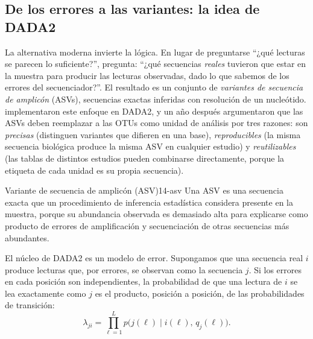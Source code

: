 \subsection{De los errores a las variantes: la idea de DADA2}

La alternativa moderna invierte la lógica. En lugar de preguntarse ``¿qué lecturas se parecen lo suficiente?'', pregunta: ``¿qué secuencias \emph{reales} tuvieron que estar en la muestra para producir las lecturas observadas, dado lo que sabemos de los errores del secuenciador?''. El resultado es un conjunto de \emph{variantes de secuencia de amplicón} (ASVs), secuencias exactas inferidas con resolución de un nucleótido. \textcite{c14-callahan2016} implementaron este enfoque en DADA2, y un año después \textcite{c14-callahan2017} argumentaron que las ASVs deben reemplazar a las OTUs como unidad de análisis por tres razones: son \emph{precisas} (distinguen variantes que difieren en una base), \emph{reproducibles} (la misma secuencia biológica produce la misma ASV en cualquier estudio) y \emph{reutilizables} (las tablas de distintos estudios pueden combinarse directamente, porque la etiqueta de cada unidad es su propia secuencia).

\begin{definicion}{Variante de secuencia de amplicón (ASV)}{14-asv}
Una ASV es una secuencia exacta que un procedimiento de inferencia estadística considera presente en la muestra, porque su abundancia observada es demasiado alta para explicarse como producto de errores de amplificación y secuenciación de otras secuencias más abundantes.
\end{definicion}

El núcleo de DADA2 es un modelo de error. Supongamos que una secuencia real $i$ produce lecturas que, por errores, se observan como la secuencia $j$. Si los errores en cada posición son independientes, la probabilidad de que una lectura de $i$ se lea exactamente como $j$ es el producto, posición a posición, de las probabilidades de transición:
\begin{equation}\label{eq:14-lambda}
\lambda_{ji} = \prod_{\ell=1}^{L} p\bigl(j(\ell)\mid i(\ell),\, q_j(\ell)\bigr).
\end{equation}

\begin{simbolos}
\end{simbolos}

